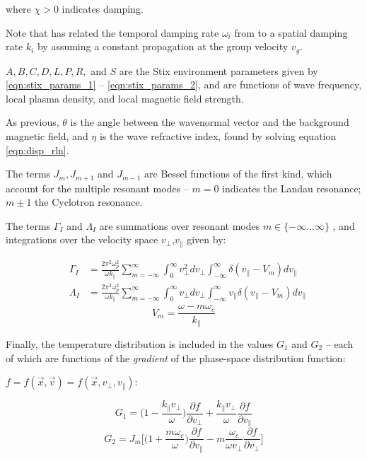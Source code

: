 where $\chi > 0$ indicates damping.

Note that \citeauthor{Brinca1972} has related the temporal damping rate $\omega_i$ from \cite{Kennel1966} to a spatial damping rate $k_i$ by assuming a constant propagation at the group velocity $v_g$.

$A, B, C, D, L, P, R,$ and $S$ are the Stix environment parameters given by \ref{eqn:stix_params_1} -- \ref{eqn:stix_params_2}, and are functions of wave frequency, local plasma density, and local magnetic field strength. 

As previous, $\theta$ is the angle between the wavenormal vector and the background magnetic field, and $\eta$ is the wave refractive index, found by solving equation \ref{eqn:disp_rln}.

The terms $J_m, J_{m+1}$ and $J_{m-1}$ are Bessel functions of the first kind, which account for the multiple resonant modes -- $m=0$ indicates the Landau resonance; $m\pm1$ the Cyclotron resonance.

The terms $\Gamma_I$ and $\Lambda_I$ are summations over resonant modes $m\in \{-\infty...\infty\}$ , and integrations over the velocity space $v_\perp$,$v_\parallel$ given by:

\begin{eqnarray}
&\Gamma_I &= \frac{2\pi^2\omega_p^2}{\omega k_\parallel} \sum_{m=-\infty}^{\infty}\int_0^\infty v_\perp^2 dv_\perp \int_{-\infty}^\infty \delta(v_\parallel - V_m) d v_\parallel \\
&\Lambda_I &= \frac{2\pi^2\omega_p^2}{\omega k_\parallel} \sum_{m=-\infty}^{\infty}\int_0^\infty v_\perp dv_\perp \int_{-\infty}^\infty v_\parallel \delta(v_\parallel - V_m) d v_\parallel
\end{eqnarray}
\begin{equation}
V_m = \frac{\omega - m\omega_c}{k_\parallel}
\end{equation}

Finally, the temperature distribution is included in the values $G_1$ and $G_2$ -- each of which are functions of the \emph{gradient} of the phase-space distribution function:

 $f=f(\vec{x}, \vec{v}) = f(\vec{x}, v_\perp, v_\parallel)$:

\begin{equation}
G_1 = \bigg(1 - \frac{k_\parallel v_\perp}{\omega}\bigg)\frac{\partial f}{\partial v_\perp} + \frac{k_\parallel v_\perp}{\omega}\frac{\partial f}{\partial v_\parallel}
\end{equation}
\begin{equation}
G_2 = J_m\bigg[\bigg(1 + \frac{m \omega_c}{\omega}\bigg)\frac{\partial f}{\partial v_\parallel} - m \frac{\omega_c}{\omega v_\perp} \frac{\partial f}{\partial v_\perp}\bigg]
\end{equation}

